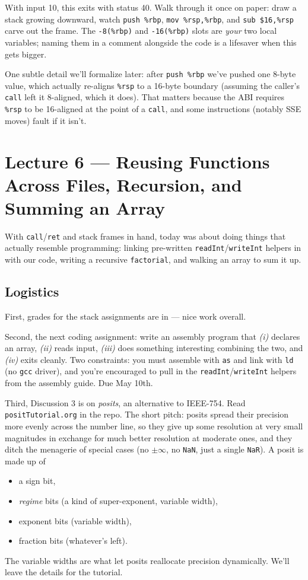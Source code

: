 \documentclass[11pt]{article}
\begin{document}
With input 10, this exits with status 40. Walk through it once
on paper: draw a stack growing downward, watch \texttt{push \%rbp},
\texttt{mov \%rsp,\%rbp}, and \texttt{sub \$16,\%rsp} carve out the
frame. The \texttt{-8(\%rbp)} and \texttt{-16(\%rbp)} slots are
\emph{your} two local variables; naming them in a comment alongside
the code is a lifesaver when this gets bigger.

One subtle detail we'll formalize later: after \texttt{push \%rbp}
we've pushed one 8-byte value, which actually re-aligns \texttt{\%rsp}
to a 16-byte boundary (assuming the caller's \texttt{call} left it
8-aligned, which it does). That matters because the ABI requires
\texttt{\%rsp} to be 16-aligned at the point of a \texttt{call},
and some instructions (notably SSE moves) fault if it isn't.

\section{Lecture 6 --- Reusing Functions Across Files, Recursion, and Summing an Array}

With \texttt{call}/\texttt{ret} and stack frames in hand, today was
about doing things that actually resemble programming: linking
pre-written \texttt{readInt}/\texttt{writeInt} helpers in with our
code, writing a recursive \texttt{factorial}, and walking an array to
sum it up.

\subsection*{Logistics}

First, grades for the stack assignments are in --- nice work overall.

Second, the next coding assignment: write an assembly program that
\emph{(i)} declares an array, \emph{(ii)} reads input, \emph{(iii)}
does something interesting combining the two, and \emph{(iv)} exits
cleanly. Two constraints: you must assemble with \texttt{as} and link
with \texttt{ld} (no \texttt{gcc} driver), and you're encouraged to
pull in the \texttt{readInt}/\texttt{writeInt} helpers from the
assembly guide. Due May 10th.

Third, Discussion 3 is on \emph{posits}, an alternative to IEEE-754.
Read \texttt{positTutorial.org} in the repo. The short pitch: posits
spread their precision more evenly across the number line, so they
give up some resolution at very small magnitudes in exchange for
much better resolution at moderate ones, and they ditch the
menagerie of special cases (no $\pm\infty$, no \texttt{NaN}, just a
single \texttt{NaR}). A posit is made up of
\begin{itemize}
  \item a sign bit,
  \item \emph{regime} bits (a kind of super-exponent, variable width),
  \item exponent bits (variable width),
  \item fraction bits (whatever's left).
\end{itemize}
The variable widths are what let posits reallocate precision
dynamically. We'll leave the details for the tutorial.
\end{document}
